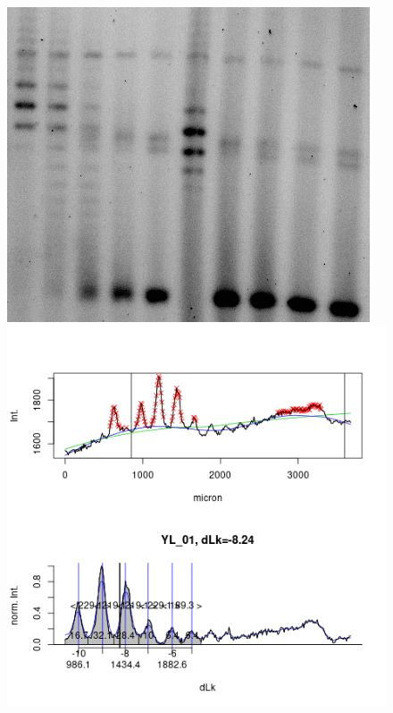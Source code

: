 \documentclass[10pt,letterpaper]{article}
\begin{document}
\begin{figure}
  \begin{minipage}{.27\textwidth}
    \includegraphics[width=\textwidth]{figures/diurnal/Y_CQ20_topoI_zoom_inv.png}
  \end{minipage}
  \begin{minipage}{.33\textwidth}
    \includegraphics[width=\textwidth]{figures/diurnal/YL_01.png}

\end{minipage}
\end{figure}
\end{document}
